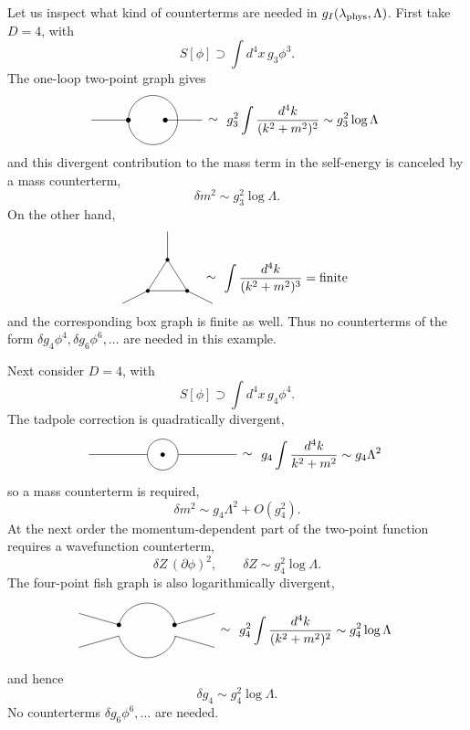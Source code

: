 Let us inspect what kind of counterterms are needed in
\(g_I(\lambda_{\rm phys},\Lambda)\).  First take \(D=4\), with
\[
  S[\phi]\supset \int d^4x\,g_3\phi^3 .
\]
The one-loop two-point graph gives
\[
\begin{tikzpicture}[baseline=(eq.base),scale=.85]
  \coordinate (eq) at (0,0);
  \draw (-2.8,0)--(-1.6,0);
  \draw (-.4,0)--(.8,0);
  \draw (-1.6,0) arc (180:0:.8);
  \draw (-1.6,0) arc (-180:0:.8);
  \fill (-1.6,0) circle (2.2pt);
  \fill (-.4,0) circle (2.2pt);
  \node at (1.15,0) {\(\sim\)};
  \node[anchor=west] at (1.45,0)
  {\(\displaystyle
    g_3^2\int \frac{d^4k}{(k^2+m^2)^2}
    \sim g_3^2\log\Lambda\)} ;
\end{tikzpicture}
\]
and this divergent contribution to the mass term in the self-energy is
canceled by a mass counterterm,
\[
  \delta m^2\sim g_3^2\log\Lambda .
\]
On the other hand,
\[
\begin{tikzpicture}[baseline=(tri.base),scale=.78]
  \coordinate (tri) at (0,0);
  \coordinate (a) at (-.7,-.45);
  \coordinate (b) at (.7,-.45);
  \coordinate (c) at (0,.65);
  \draw (a)--(b)--(c)--cycle;
  \draw (a)--++(-.9,-.45);
  \draw (b)--++(.9,-.45);
  \draw (c)--++(0,1);
  \fill (a) circle (2pt);
  \fill (b) circle (2pt);
  \fill (c) circle (2pt);
  \node at (1.55,0) {\(\sim\)};
  \node[anchor=west] at (1.85,0)
  {\(\displaystyle
    \int \frac{d^4k}{(k^2+m^2)^3}=\hbox{finite}\)} ;
\end{tikzpicture}
\]
and the corresponding box graph is finite as well.  Thus no counterterms of
the form \(\delta g_4\phi^4,\delta g_6\phi^6,\ldots\) are needed in this
example.

Next consider \(D=4\), with
\[
  S[\phi]\supset \int d^4x\,g_4\phi^4 .
\]
The tadpole correction is quadratically divergent,
\[
\begin{tikzpicture}[baseline=(eq.base),scale=.85]
  \coordinate (eq) at (0,0);
  \draw (-2.4,0)--(-.5,0);
  \draw (.5,0)--(2.4,0);
  \draw (0,0) circle (.5);
  \fill (0,0) circle (2pt);
  \node at (2.75,0) {\(\sim\)};
  \node[anchor=west] at (3.05,0)
  {\(\displaystyle
    g_4\int \frac{d^4k}{k^2+m^2}\sim g_4\Lambda^2\)} ;
\end{tikzpicture}
\]
so a mass counterterm is required,
\[
  \delta m^2\sim g_4\Lambda^2+O(g_4^2).
\]
At the next order the momentum-dependent part of the two-point function
requires a wavefunction counterterm,
\[
  \delta Z\,(\partial\phi)^2,\qquad
  \delta Z\sim g_4^2\log\Lambda .
\]
The four-point fish graph is also logarithmically divergent,
\[
\begin{tikzpicture}[baseline=(eq.base),scale=.85]
  \coordinate (eq) at (0,0);
  \draw (-2.2,.55)--(-.9,.18);
  \draw (-2.2,-.55)--(-.9,-.18);
  \draw (.9,.18)--(2.2,.55);
  \draw (.9,-.18)--(2.2,-.55);
  \draw (-.9,.18) arc (165:15:.95);
  \draw (-.9,-.18) arc (-165:-15:.95);
  \fill (-.9,.18) circle (2pt);
  \fill (.9,.18) circle (2pt);
  \node at (2.55,0) {\(\sim\)};
  \node[anchor=west] at (2.85,0)
  {\(\displaystyle
    g_4^2\int \frac{d^4k}{(k^2+m^2)^2}
    \sim g_4^2\log\Lambda\)} ;
\end{tikzpicture}
\]
and hence
\[
  \delta g_4\sim g_4^2\log\Lambda .
\]
No counterterms \(\delta g_6\phi^6,\ldots\) are needed.

